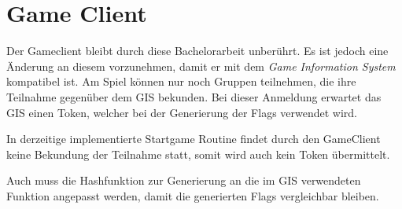 \section{Game Client} \label{sec:Game_Client}
Der Gameclient bleibt durch diese Bachelorarbeit unberührt. Es ist jedoch eine Änderung an diesem vorzunehmen, damit er mit dem \textit{Game Information System} kompatibel ist.
Am Spiel können nur noch Gruppen teilnehmen, die ihre Teilnahme gegenüber dem GIS bekunden. Bei dieser Anmeldung erwartet das GIS einen Token, welcher bei der Generierung der Flags verwendet wird. 

In derzeitige implementierte Startgame Routine findet durch den GameClient keine Bekundung der Teilnahme statt, somit wird auch kein Token übermittelt.

Auch muss die Hashfunktion zur Generierung an die im GIS verwendeten Funktion angepasst werden, damit die generierten Flags vergleichbar bleiben.